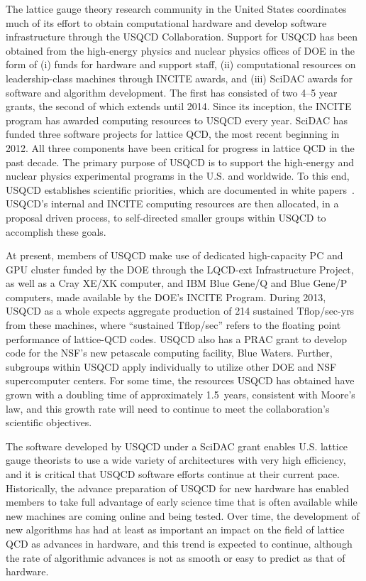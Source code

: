 The lattice gauge theory research community in the United States coordinates
much of its effort to obtain computational hardware and develop software
infrastructure through the USQCD Collaboration.  Support for USQCD has been
obtained from the high-energy physics and nuclear physics offices of DOE in
the form of (i) funds for hardware and support staff, (ii) computational
resources on leadership-class machines through INCITE awards, and (iii) SciDAC
awards for software and algorithm development.  The first has consisted of two
4--5 year grants, the second of which extends until 2014.  Since its
inception, the INCITE program has awarded computing resources to USQCD every
year.  SciDAC has funded three software projects for lattice QCD, the most
recent beginning in 2012.  All three components have been critical for
progress in lattice QCD in the past decade.  The primary purpose of USQCD is
to support the high-energy and nuclear physics experimental programs in the
U.S. and worldwide.  To this end, USQCD establishes scientific priorities,
which are documented in white
papers~\cite{USQCD_EF_whitepaper13,USQCD_IF_whitepaper13,USQCD_NP_whitepaper13,USQCD_Thermo_whitepaper13}.
USQCD's internal and INCITE computing resources are then allocated, in a
proposal driven process, to self-directed smaller groups within USQCD to
accomplish these goals.

At present, members of USQCD make use of dedicated high-capacity PC and GPU
cluster funded by the DOE through the LQCD-ext Infrastructure Project, as well
as a Cray XE/XK computer, and IBM Blue Gene/Q and Blue Gene/P computers, made
available by the DOE's INCITE Program.  During 2013, USQCD as a whole expects
aggregate production of 214 sustained Tflop/sec-yrs from these machines, where
``sustained Tflop/sec'' refers to the floating point performance of lattice-QCD
codes.  USQCD also has a PRAC grant to develop code for the NSF's new
petascale computing facility, Blue Waters.  Further, subgroups within USQCD
apply individually to utilize other DOE and NSF supercomputer centers.  For
some time, the resources USQCD has obtained have grown with a doubling time of
approximately 1.5~years, consistent with Moore's law, and this growth rate
will need to continue to meet the collaboration's scientific objectives.
 
The software developed by USQCD under a SciDAC grant enables U.S. lattice
gauge theorists to use a wide variety of architectures with very high
efficiency, and it is critical that USQCD software efforts continue at their
current pace.  Historically, the advance preparation of USQCD for new hardware
has enabled members to take full advantage of early science time that is often
available while new machines are coming online and being tested.  Over time,
the development of new algorithms has had at least as important an impact on
the field of lattice QCD as advances in hardware, and this trend is expected
to continue, although the rate of algorithmic advances is not as smooth or
easy to predict as that of hardware.

